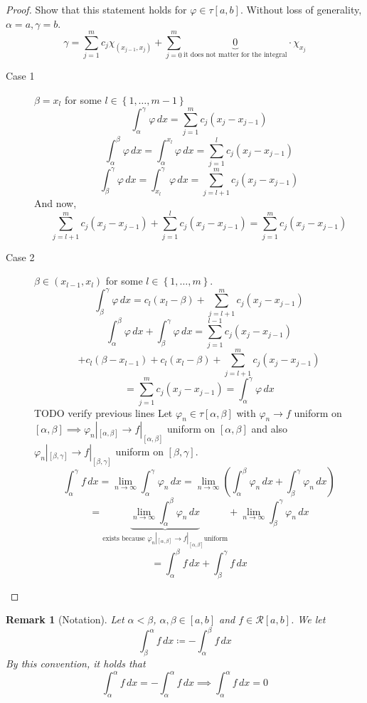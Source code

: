 \documentclass{article}
\newtheorem{remark}{Remark}  \numberwithin{remark}{section}
\newcommand{\set}[1]{\left\{#1\right\}}
\begin{document}
\begin{proof}
  Show that this statement holds for $\varphi \in \tau[a,b]$.
  Without loss of generality, $\alpha = a, \gamma = b$.
  \[
    \gamma = \sum_{j=1}^m c_j \chi_{(x_{j-1}, x_j)} + \sum_{j=0}^m \underbrace{0}_{\text{it does not matter for the integral}} \cdot \chi_{x_j}
  \]
  \begin{description}
    \item[Case 1] 
      $\beta = x_l$ for some $l \in \set{1, \dots, m-1}$
      \[ \int_{\alpha}^\gamma \varphi \, dx = \sum_{j=1}^m c_j (x_j - x_{j-1}) \]
      \[ \int_{\alpha}^\beta \varphi \, dx = \int_{\alpha}^{x_l} \varphi \, dx = \sum_{j=1}^l c_j (x_j - x_{j-1}) \]
      \[ \int_{\beta}^\gamma \varphi \, dx = \int_{x_l}^{\gamma} \varphi \, dx = \sum_{j=l+1}^m c_j (x_j - x_{j-1}) \]
      And now,
      \[ \sum_{j=l+1}^m c_j (x_j - x_{j-1}) + \sum_{j=1}^l c_j (x_j - x_{j-1}) = \sum_{j=1}^m c_j (x_j - x_{j-1}) \]
    \item[Case 2]
      $\beta \in (x_{l-1}, x_l)$ for some $l \in \set{1, \ldots, m}$.
      \[ \int_\beta^\gamma \varphi \,dx = c_l(x_l - \beta)+ \sum_{j=l+1}^m c_j (x_j - x_{j-1}) \]
      \[ \int_{\alpha}^\beta \varphi \,dx + \int_\beta^\gamma \varphi \,dx = \sum_{j=1}^{l-1} c_j (x_j - x_{j-1}) \]
      \[ + c_l(\beta - x_{l-1}) + c_l (x_l - \beta) + \sum_{j=l+1}^m c_j(x_j - x_{j-1}) \]
      \[ = \sum_{j=1}^m c_j(x_j - x_{j-1}) = \int_{\alpha}^\gamma \varphi \, dx \]
      TODO verify previous lines
      Let $\varphi_n \in \tau[\alpha,\beta]$ with $\varphi_n \to f$ uniform on $[\alpha, \beta] \implies \varphi_n|_{[\alpha,\beta]} \to f|_{[\alpha,\beta]}$ uniform on $[\alpha,\beta]$ and also $\varphi_n|_{[\beta,\gamma]} \to f|_{[\beta,\gamma]}$ uniform on $[\beta,\gamma]$.
      \[ \int_{\alpha}^\gamma f \, dx = \lim_{n\to\infty} \int_{\alpha}^\gamma \varphi_n \, dx = \lim_{n\to\infty} (\int_{\alpha}^\beta \varphi_n \, dx + \int_{\beta}^\gamma \varphi_n \, dx) \]
      \[
        = \underbrace{\lim_{n\to\infty} \int_{\alpha}^\beta \varphi_n \, dx}_{\text{exists because } \varphi_n|_{[\alpha,\beta]} \to f|_{[\alpha,\beta]} \text{uniform}} + \lim_{n\to\infty} \int_{\beta}^\gamma \varphi_n \, dx
      \] \[
        = \int_{\alpha}^\beta f \, dx + \int_{\beta}^\gamma f \, dx
      \]
  \end{description}
\end{proof}

\begin{remark}[Notation]
  Let $\alpha < \beta$, $\alpha, \beta \in [a,b]$ and $f \in \mathcal R[a,b]$. We let
  \[ \int_{\beta}^\alpha f \, dx \coloneqq -\int_{\alpha}^\beta f \, dx \]
  By this convention, it holds that
  \[ \int_{\alpha}^\alpha f \, dx = -\int_{\alpha}^\alpha f \, dx \implies \int_{\alpha}^\alpha f \, dx = 0 \]
\end{remark}
\end{document}
